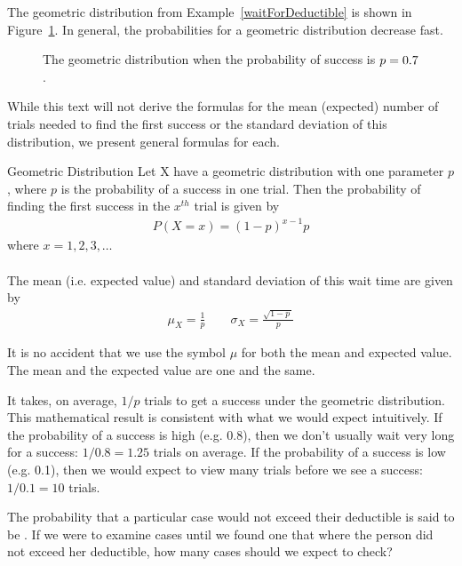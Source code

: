 The geometric distribution from Example~\ref{waitForDeductible} is shown in Figure~\ref{geometricDist70}. In general, the probabilities for a geometric distribution decrease  fast.

\begin{figure}[h]
  \centering
  \caption{The geometric distribution when the probability
      of success is $p = 0.7{}$.}
  \label{geometricDist70}
\end{figure}

While this text will not derive the formulas for the mean (expected) number of trials needed to find the first success or the standard deviation of this distribution, we present general formulas for each.

\begin{onebox}{Geometric Distribution}
  Let X have a geometric distribution with one parameter $p$, where $p$ is the probability of a success in one trial.   Then the
  probability of finding the first success in the
  $x^{th}$ trial is given by\vspace{-1.5mm}
  \begin{align*}
  P(X = x) = (1-p)^{x-1}p
  \end{align*}
where $x=1,2,3,\dots$\\
\\
  The mean (i.e. expected value) and standard deviation of this wait time are given by
  \begin{align*}
  \mu_{\scriptscriptstyle{X}} = \frac{1}{p}
      \qquad \sigma_{\scriptscriptstyle{X}} = \frac{\sqrt{1-p\ }}{p}
  \end{align*}
\end{onebox}

It is no accident that we use the symbol $\mu$ for both the mean and expected value. The mean and the expected value are one and the same.

It takes, on average, $1/p$ trials to get a success under the geometric distribution. This mathematical result is consistent with what we would expect intuitively. If the probability of a success is high (e.g. 0.8), then we don't usually wait very long for a success: $1/0.8 = 1.25$ trials on average. If the probability of a success is low (e.g. 0.1), then we would expect to view many trials before we see a success: $1/0.1 = 10$ trials.


\begin{exercisewrap}
\begin{nexercise}
The probability that a particular case would not exceed their
deductible is said to be \insureSprob{}.
If we were to examine cases until we found one that where
the person did not exceed her deductible, how many cases should
we expect to check?\footnotemark{}
\end{nexercise}
\end{exercisewrap}

